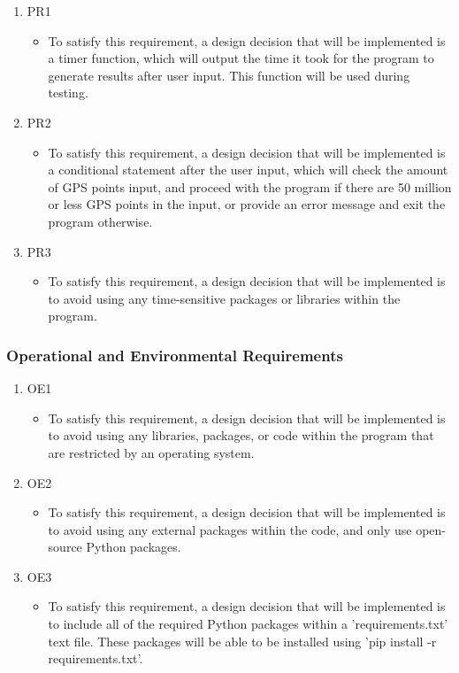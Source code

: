 \documentclass[12pt, titlepage]{article}
\begin{document}
\begin{enumerate}
    \item PR1
    \begin{itemize}
        \item To satisfy this requirement, a design decision that will be implemented is a timer function, which will output the time it took for the program to generate results after user input. This function will be used during testing.
    \end{itemize}
    \item PR2
    \begin{itemize}
        \item To satisfy this requirement, a design decision that will be implemented is a conditional statement after the user input, which will check the amount of GPS points input, and proceed with the program if there are 50 million or less GPS points in the input, or provide an error message and exit the program otherwise.
    \end{itemize}
    \item PR3
    \begin{itemize}
        \item To satisfy this requirement, a design decision that will be implemented is to avoid using any time-sensitive packages or libraries within the program.
    \end{itemize}
\end{enumerate}

\subsubsection{Operational and Environmental Requirements}

\begin{enumerate}
    \item OE1
    \begin{itemize}
        \item To satisfy this requirement, a design decision that will be implemented is to avoid using any libraries, packages, or code within the program that are restricted by an operating system.
    \end{itemize}
    \item OE2
    \begin{itemize}
        \item To satisfy this requirement, a design decision that will be implemented is to avoid using any external packages within the code, and only use open-source Python packages.
    \end{itemize}
    \item OE3
    \begin{itemize}
        \item To satisfy this requirement, a design decision that will be implemented is to include all of the required Python packages within a 'requirements.txt' text file. These packages will be able to be installed using 'pip install -r requirements.txt'.
    \end{itemize}
\end{enumerate}
\end{document}

